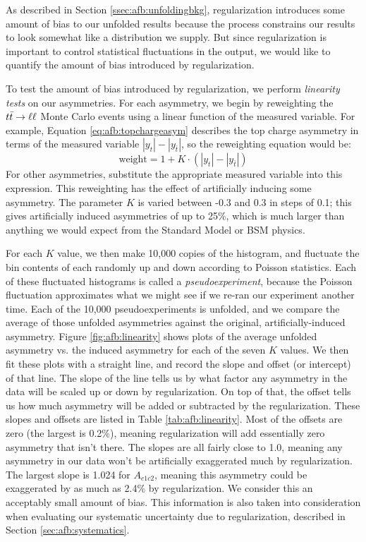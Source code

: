 As described in Section \ref{ssec:afb:unfoldingbkg}, regularization
introduces some amount of bias to our unfolded results because the
process constrains our results to look somewhat like a distribution
we supply. But since regularization is important to
control statistical fluctuations in the output, we would like to
quantify the amount of bias introduced by regularization.

To test the amount of bias introduced by regularization, we perform
\emph{linearity tests} on our asymmetries. For each asymmetry, we
begin by reweighting the $t\bar{t} \rightarrow \ell\ell$ Monte Carlo events using a linear
function of the measured variable. For example, Equation
\ref{eq:afb:topchargeasym} describes the top charge asymmetry in terms
of the measured variable $|y_t| - |y_{\bar{t}}|$, so the reweighting
equation would be:
\begin{equation}
\text{weight} = 1 + K \cdot (|y_t| - |y_{\bar{t}}|)
\end{equation}
For other asymmetries, substitute the appropriate measured variable
into this expression. This reweighting has the effect of artificially
inducing some asymmetry. The parameter $K$ is varied between -0.3 and 0.3
in steps of 0.1; this gives artificially induced asymmetries of up to
25\%, which is much larger than anything we would expect from the
Standard Model or BSM physics.

For each $K$ value, we then make 10,000 copies of the histogram, and
fluctuate the bin contents of each randomly up and down according to
Poisson statistics. Each of these fluctuated histograms is called a
\emph{pseudoexperiment}, because the Poisson fluctuation approximates
what we might see if we re-ran our experiment another time. Each of
the 10,000 pseudoexperiments is unfolded, and we compare the average
of those unfolded asymmetries against the original,
artificially-induced asymmetry. Figure \ref{fig:afb:linearity}
shows plots of the average unfolded asymmetry vs. the induced asymmetry
for each of the seven $K$ values. We then fit these plots
with a straight line, and record the slope and offset
(or intercept) of that line. The slope of the line tells us by what
factor any asymmetry in the data will be scaled up or down by
regularization. On top of that, the offset tells us how much asymmetry
will be added or subtracted by the regularization. These slopes and
offsets are listed in Table \ref{tab:afb:linearity}. Most of the offsets are
zero (the largest is 0.2\%), meaning regularization will add
essentially zero asymmetry that isn't there. The slopes are all fairly
close to 1.0, meaning any asymmetry in our data won't be artificially
exaggerated much by regularization. The largest slope is 1.024 for
$A_{c1c2}$, meaning this asymmetry could be exaggerated by as much as
2.4\% by regularization. We consider this an acceptably small amount
of bias. This information is also taken into consideration when
evaluating our systematic uncertainty due to regularization, described
in Section \ref{sec:afb:systematics}.

